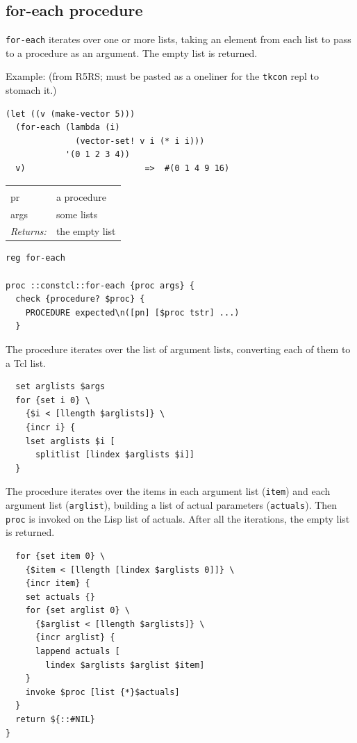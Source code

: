\documentclass[a5paper,draft]{memoir}
\begin{document}
\subsection{for-each procedure}
\label{foreach-procedure}

\texttt{for-each} iterates over one or more lists, taking an element from each list to pass to a procedure as an argument. The empty list is returned.

Example: (from R5RS; must be pasted as a oneliner for the \texttt{tkcon} repl to stomach it.)

\begin{verbatim}
(let ((v (make-vector 5)))
  (for-each (lambda (i)
              (vector-set! v i (* i i)))
            '(0 1 2 3 4))
  v)                        =>  #(0 1 4 9 16)
\end{verbatim}

\noindent\begin{tabular}{ |p{1.9cm} p{6.5cm}| }
\hline
\rowcolor[HTML]{CCCCCC} \multicolumn{2}{|l|}{\textbf{for-each (public)}} \\
pr & a procedure \\
args & some lists \\
\textit{Returns:} & the empty list \\
\hline
\end{tabular}

\begin{lstlisting}
reg for-each

proc ::constcl::for-each {proc args} {
  check {procedure? $proc} {
    PROCEDURE expected\n([pn] [$proc tstr] ...)
  }
\end{lstlisting}

The procedure iterates over the list of argument lists, converting each of them to a Tcl list.

\begin{lstlisting}
  set arglists $args
  for {set i 0} \
    {$i < [llength $arglists]} \
    {incr i} {
    lset arglists $i [
      splitlist [lindex $arglists $i]]
  }
\end{lstlisting}

The procedure iterates over the items in each argument list (\texttt{item}) and each argument list (\texttt{arglist}), building a list of actual parameters (\texttt{actuals}). Then \texttt{proc} is invoked on the Lisp list of actuals. After all the iterations, the empty list is returned.

\begin{lstlisting}
  for {set item 0} \
    {$item < [llength [lindex $arglists 0]]} \
    {incr item} {
    set actuals {}
    for {set arglist 0} \
      {$arglist < [llength $arglists]} \
      {incr arglist} {
      lappend actuals [
        lindex $arglists $arglist $item]
    }
    invoke $proc [list {*}$actuals]
  }
  return ${::#NIL}
}
\end{lstlisting}
\end{document}
